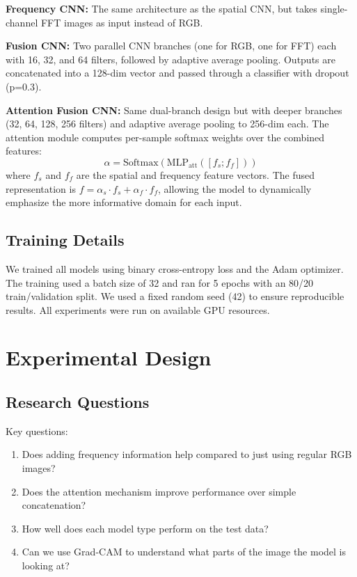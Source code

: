\documentclass{article}
\begin{document}
\textbf{Frequency CNN:} The same architecture as the spatial CNN, but takes single-channel FFT images as input instead of RGB.

\textbf{Fusion CNN:} Two parallel CNN branches (one for RGB, one for FFT) each with 16, 32, and 64 filters, followed by adaptive average pooling. Outputs are concatenated into a 128-dim vector and passed through a classifier with dropout (p=0.3).

\textbf{Attention Fusion CNN:} Same dual-branch design but with deeper branches (32, 64, 128, 256 filters) and adaptive average pooling to 256-dim each. The attention module computes per-sample softmax weights over the combined features:
\begin{equation}
\alpha = \text{Softmax}(\text{MLP}_{\text{att}}([f_s; f_f]))
\end{equation}
where $f_s$ and $f_f$ are the spatial and frequency feature vectors. The fused representation is $f = \alpha_s \cdot f_s + \alpha_f \cdot f_f$, allowing the model to dynamically emphasize the more informative domain for each input.

\subsection{Training Details}

We trained all models using binary cross-entropy loss and the Adam optimizer. The training used a batch size of 32 and ran for 5 epochs with an 80/20 train/validation split. We used a fixed random seed (42) to ensure reproducible results. All experiments were run on available GPU resources.

\section{Experimental Design}

\subsection{Research Questions}

Key questions:
\begin{enumerate}
  \item Does adding frequency information help compared to just using regular RGB images?
  \item Does the attention mechanism improve performance over simple concatenation?
  \item How well does each model type perform on the test data?
  \item Can we use Grad-CAM to understand what parts of the image the model is looking at?
\end{enumerate}
\end{document}
